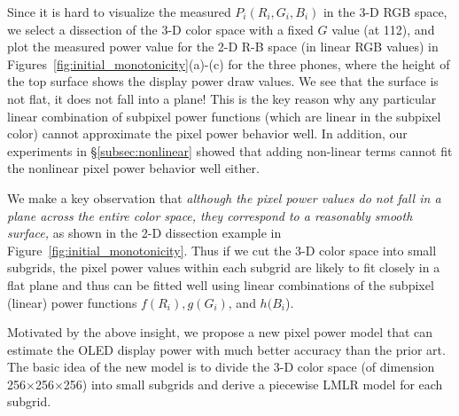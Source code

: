 Since it is hard to visualize the measured $P_i(R_i, G_i,B_i)$ in the
3-D RGB space, we select a dissection of the 3-D color space with a fixed
$G$ value (at 112), and plot the measured power value for the 2-D R-B space (in
linear RGB values) in Figures~\ref{fig:initial_monotonicity}(a)-(c) for
the three phones, where the height of the top surface shows the display power
draw values.  We see that the surface is not flat, \ie it does not fall into a plane! This is
the key reason why any particular linear combination of subpixel power functions
(which are linear in the subpixel color) cannot approximate
the pixel power behavior well. In addition,
our experiments in \S\ref{subsec:nonlinear} showed
that adding non-linear terms cannot fit the nonlinear pixel power behavior well either.

We make a key observation that {\em although the pixel power values do not
fall in a plane across the entire color space, they correspond to a reasonably smooth surface,}
\eg as shown in the 2-D dissection example in Figure~\ref{fig:initial_monotonicity}. 
Thus if we cut the 3-D color space into small subgrids, the
pixel power values within each subgrid are likely to fit closely in
a flat plane and thus can be fitted well using linear combinations
of the subpixel (linear) power functions $f(R_{i}), g(G_i)$, and $h(B_i$).

Motivated by the above insight, we propose a new pixel power model
that can estimate the OLED display power with much better accuracy
than the prior art.  The basic idea of the new model is to divide the 3-D
color space (of dimension 256$\times$256$\times$256) into small subgrids
and derive a piecewise LMLR model for each subgrid.



